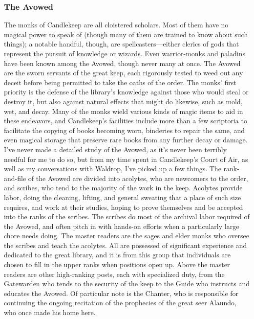 \documentclass[10pt,a4paper,twoside,twocolumn,openany,bg=print,nodeprecatedcode]{dndbook}
\begin{document}
\subsubsection{The Avowed}
The monks of Candlekeep are all cloistered scholars. Most of them have no magical power to speak of (though many of them are trained to know about such things); a notable handful, though, are spellcasters—either clerics of gods that represent the pursuit of knowledge or wizards. Even warrior-monks and paladins have been known among the Avowed, though never many at once.
The Avowed are the sworn servants of the great keep, each rigorously tested to weed out any deceit before being permitted to take the oaths of the order. The monks' first priority is the defense of the library's knowledge against those who would steal or destroy it, but also against natural effects that might do likewise, such as mold, wet, and decay. Many of the monks wield various kinds of magic items to aid in these endeavors, and Candlekeep's facilities include more than a few scriptoria to facilitate the copying of books becoming worn, binderies to repair the same, and even magical storage that preserve rare books from any further decay or damage.
I've never made a detailed study of the Avowed, as it's never been terribly needful for me to do so, but from my time spent in Candlekeep's Court of Air, as well as my conversations with Waldrop, I've picked up a few things.
The rank-and-file of the Avowed are divided into acolytes, who are newcomers to the order, and scribes, who tend to the majority of the work in the keep. Acolytes provide labor, doing the cleaning, lifting, and general sweating that a place of such size requires, and work at their studies, hoping to prove themselves and be accepted into the ranks of the scribes. The scribes do most of the archival labor required of the Avowed, and often pitch in with hands-on efforts when a particularly large chore needs doing.
The master readers are the sages and elder monks who oversee the scribes and teach the acolytes. All are possessed of significant experience and dedicated to the great library, and it is from this group that individuals are chosen to fill in the upper ranks when positions open up.
Above the master readers are other high-ranking posts, each with specialized duty, from the Gatewarden who tends to the security of the keep to the Guide who instructs and educates the Avowed. Of particular note is the Chanter, who is responsible for continuing the ongoing recitation of the prophecies of the great seer Alaundo, who once made his home here.
\end{document}
